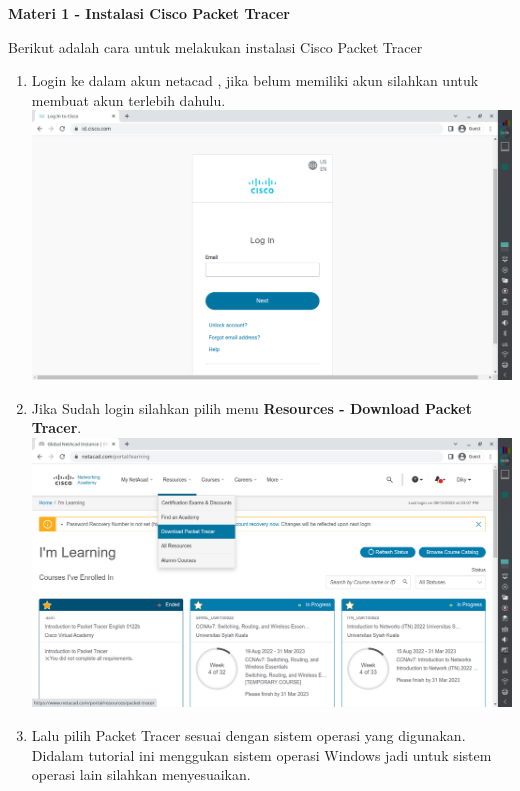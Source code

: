 \documentclass{article}
\begin{document}
    \begin{flushleft}
        \textbf{Materi 1 - Instalasi Cisco Packet Tracer}
        \newline

        Berikut adalah cara untuk melakukan instalasi Cisco Packet Tracer

        \begin{enumerate}
            \item{
                Login ke dalam akun netacad , jika belum memiliki akun silahkan untuk membuat akun terlebih dahulu. \includegraphics[scale=0.30]{login.png}
                \newline
            }
            \item{
                Jika Sudah login silahkan pilih menu \textbf{Resources - Download Packet Tracer}. \includegraphics[scale=0.30]{dl-menu.png}
                \newline
            }
            \item{
                Lalu pilih Packet Tracer sesuai dengan sistem operasi yang digunakan. Didalam tutorial ini menggukan sistem operasi Windows jadi untuk sistem operasi lain silahkan menyesuaikan.
}
\end{enumerate}
\end{flushleft}
\end{document}
